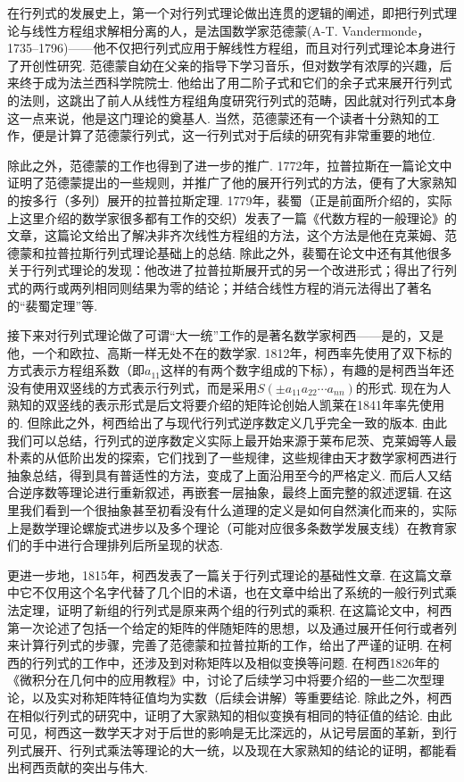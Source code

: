 在行列式的发展史上，第一个对行列式理论做出连贯的逻辑的阐述，即把行列式理论与线性方程组求解相分离的人，是法国数学家范德蒙(A-T. Vandermonde，1735--1796)——他不仅把行列式应用于解线性方程组，而且对行列式理论本身进行了开创性研究. 范德蒙自幼在父亲的指导下学习音乐，但对数学有浓厚的兴趣，后来终于成为法兰西科学院院士. 他给出了用二阶子式和它们的余子式来展开行列式的法则，这跳出了前人从线性方程组角度研究行列式的范畴，因此就对行列式本身这一点来说，他是这门理论的奠基人. 当然，范德蒙还有一个读者十分熟知的工作，便是计算了范德蒙行列式，这一行列式对于后续的研究有非常重要的地位.

除此之外，范德蒙的工作也得到了进一步的推广. 1772年，拉普拉斯在一篇论文中证明了范德蒙提出的一些规则，并推广了他的展开行列式的方法，便有了大家熟知的按多行（多列）展开的拉普拉斯定理. 1779年，裴蜀（正是前面所介绍的，实际上这里介绍的数学家很多都有工作的交织）发表了一篇《代数方程的一般理论》的文章，这篇论文给出了解决非齐次线性方程组的方法，这个方法是他在克莱姆、范德蒙和拉普拉斯行列式理论基础上的总结. 除此之外，裴蜀在论文中还有其他很多关于行列式理论的发现：他改进了拉普拉斯展开式的另一个改进形式；得出了行列式的两行或两列相同则结果为零的结论；并结合线性方程的消元法得出了著名的``裴蜀定理''等.

接下来对行列式理论做了可谓``大一统''工作的是著名数学家柯西——是的，又是他，一个和欧拉、高斯一样无处不在的数学家. 1812年，柯西率先使用了双下标的方式表示方程组系数（即$a_{11}$这样的有两个数字组成的下标），有趣的是柯西当年还没有使用双竖线的方式表示行列式，而是采用$S(\pm a_{11}a_{22}\cdots a_{nn})$的形式. 现在为人熟知的双竖线的表示形式是后文将要介绍的矩阵论创始人凯莱在1841年率先使用的. 但除此之外，柯西给出了与现代行列式逆序数定义几乎完全一致的版本. 由此我们可以总结，行列式的逆序数定义实际上最开始来源于莱布尼茨、克莱姆等人最朴素的从低阶出发的探索，它们找到了一些规律，这些规律由天才数学家柯西进行抽象总结，得到具有普适性的方法，变成了上面沿用至今的严格定义. 而后人又结合逆序数等理论进行重新叙述，再嵌套一层抽象，最终上面完整的叙述逻辑. 在这里我们看到一个很抽象甚至初看没有什么道理的定义是如何自然演化而来的，实际上是数学理论螺旋式进步以及多个理论（可能对应很多条数学发展支线）在教育家们的手中进行合理排列后所呈现的状态.

更进一步地，1815年，柯西发表了一篇关于行列式理论的基础性文章. 在这篇文章中它不仅用这个名字代替了几个旧的术语，也在文章中给出了系统的一般行列式乘法定理，证明了新组的行列式是原来两个组的行列式的乘积. 在这篇论文中，柯西第一次论述了包括一个给定的矩阵的伴随矩阵的思想，以及通过展开任何行或者列来计算行列式的步骤，完善了范德蒙和拉普拉斯的工作，给出了严谨的证明. 在柯西的行列式的工作中，还涉及到对称矩阵以及相似变换等问题. 在柯西1826年的《微积分在几何中的应用教程》中，讨论了后续学习中将要介绍的一些二次型理论，以及实对称矩阵特征值均为实数（后续会讲解）等重要结论. 除此之外，柯西在相似行列式的研究中，证明了大家熟知的相似变换有相同的特征值的结论. 由此可见，柯西这一数学天才对于后世的影响是无比深远的，从记号层面的革新，到行列式展开、行列式乘法等理论的大一统，以及现在大家熟知的结论的证明，都能看出柯西贡献的突出与伟大.

